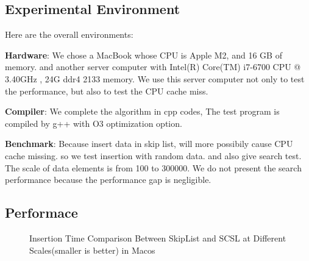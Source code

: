 \documentclass{article}
\begin{document}
\subsection{Experimental Environment}

Here are the overall environments:

\textbf{Hardware}: We chose a MacBook whose CPU is Apple M2, and 16 GB of memory. and another server computer with Intel(R) Core(TM) i7-6700 CPU @ 3.40GHz , 24G ddr4 2133 memory. We use this server computer not only to test the performance, but also to test the CPU cache miss.

\textbf{Compiler}: We complete the algorithm in cpp codes, The test program is compiled by g++ with O3 optimization option. 

\textbf{Benchmark}:  Because insert data in skip list, will more possibily cause CPU cache missing. so we test insertion with random data. and also give search test. The scale of data elements is from 100 to 300000. We do not present the search performance because the performance gap is negligible.


\subsection{Performace}
\begin{figure}[htbp]
\centering
{}
\caption{Insertion Time Comparison Between SkipList and SCSL at Different Scales(smaller is better) in Macos}
\end{figure}
\end{document}
